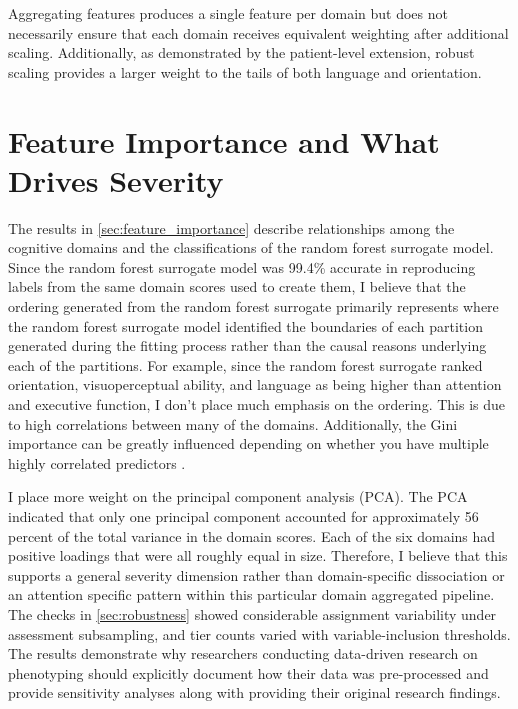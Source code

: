 Aggregating features produces a single feature per domain but does not necessarily ensure that each domain receives equivalent weighting after additional scaling. Additionally, as demonstrated by the patient-level extension, robust scaling provides a larger weight to the tails of both language and orientation.

\section{Feature Importance and What Drives Severity}
The results in \textsection{}\ref{sec:feature_importance} describe relationships among the cognitive domains and the classifications of the random forest surrogate model. Since the random forest surrogate model was 99.4\% accurate in reproducing labels from the same domain scores used to create them, I believe that the ordering generated from the random forest surrogate primarily represents where the random forest surrogate model identified the boundaries of each partition generated during the fitting process rather than the causal reasons underlying each of the partitions. For example, since the random forest surrogate ranked orientation, visuoperceptual ability, and language as being higher than attention and executive function, I don't place much emphasis on the ordering. This is due to high correlations between many of the domains. Additionally, the Gini importance can be greatly influenced depending on whether you have multiple highly correlated predictors \parencite{boulesteix2012overview}.

I place more weight on the principal component analysis (PCA). The PCA indicated that only one principal component accounted for approximately 56 percent of the total variance in the domain scores. Each of the six domains had positive loadings that were all roughly equal in size. Therefore, I believe that this supports a general severity dimension rather than domain-specific dissociation or an attention specific pattern within this particular domain aggregated pipeline. The checks in \textsection{}\ref{sec:robustness} showed considerable assignment variability under assessment subsampling, and tier counts varied with variable-inclusion thresholds. The results demonstrate why researchers conducting data-driven research on phenotyping should explicitly document how their data was pre-processed and provide sensitivity analyses along with providing their original research findings.

